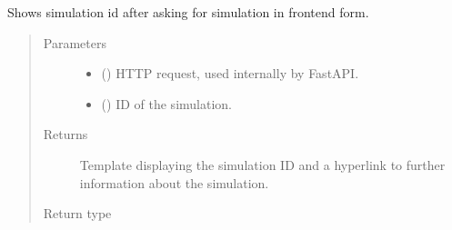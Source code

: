 \documentclass[a4paper,landscape,10pt,english]{sphinxmanual}
\begin{document}
\begin{fulllineitems}
\label{\detokenize{code_docs/simulation_api.controller:simulation_api.controller.main.simulate_id_sim_id}}
Shows simulation id after asking for simulation in frontend form.
\begin{quote}\begin{description}
\item[{Parameters}] \leavevmode\begin{itemize}
\item {} 
 () \textendash{} HTTP request, used internally by FastAPI.

\item {} 
 () \textendash{} ID of the simulation.

\end{itemize}

\item[{Returns}] \leavevmode
Template displaying the simulation ID and a hyperlink to
further information about the simulation.

\item[{Return type}] \leavevmode
{}

\end{description}\end{quote}

\end{fulllineitems}

\end{document}

